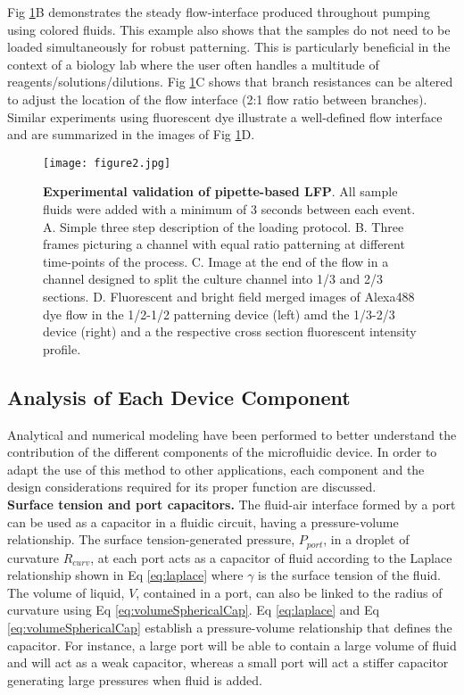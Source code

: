 Fig \ref{fig:experimental1}B demonstrates the steady flow-interface produced throughout pumping using colored fluids. This example also shows that the samples do not need to be loaded simultaneously for robust patterning. This is particularly beneficial in the context of a biology lab where the user often handles a multitude of reagents\slash solutions\slash dilutions. Fig \ref{fig:experimental1}C shows that branch resistances can be altered to adjust the location of the flow interface (2:1 flow ratio between branches). Similar experiments using fluorescent dye illustrate a well-defined flow interface and are summarized in the images of Fig \ref{fig:experimental1}D.
\begin{figure}[!t]
\centering
  \texttt{[image: figure2.jpg]}
  \caption{\textbf{Experimental validation of pipette-based LFP}. All sample fluids were added with a minimum of 3 seconds between each event. A. Simple three step description of the loading protocol. B. Three frames picturing a channel with equal ratio patterning at different time-points of the process. C. Image at the end of the flow in a channel designed to split the culture channel into 1/3 and 2/3 sections. D. Fluorescent and bright field merged images of Alexa488 dye flow in the 1/2-1/2 patterning device (left) amd the 1/3-2/3 device (right) and a the respective cross section fluorescent intensity profile. }
  \label{fig:experimental1}
\end{figure}

\subsection{Analysis of Each Device Component}

Analytical and numerical modeling have been performed to better understand the contribution of the different components of the microfluidic device. In order to adapt the use of this method to other applications, each component and the design considerations required for its proper function are discussed. \\

{\bf Surface tension and port capacitors.} The fluid-air interface formed by a port can be used as a capacitor in a fluidic circuit, having a pressure-volume relationship. The surface tension-generated pressure, $P_{port}$, in a droplet of curvature $R_{curv}$, at each port acts as a capacitor of fluid according to the Laplace relationship shown in Eq \ref{eq:laplace} where $\gamma$ is the surface tension of the fluid. The volume of liquid, $V$, contained in a port, can also be linked to the radius of curvature using Eq \ref{eq:volumeSphericalCap}. Eq \ref{eq:laplace} and Eq \ref{eq:volumeSphericalCap} establish a pressure-volume relationship that defines the capacitor. For instance, a large port will be able to contain a large volume of fluid and will act as a weak capacitor, whereas a small port will act a stiffer capacitor generating large pressures when fluid is added. 

